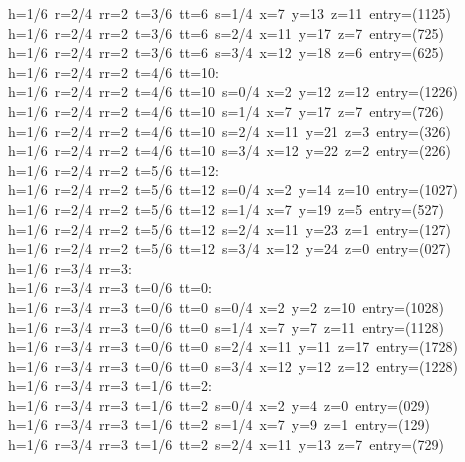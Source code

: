 \begin{tabbing}
h=1/6\ r=2/4\ rr=2\ t=3/6\ tt=6\ s=1/4\ x=7\ y=13\ z=11\ entry=(1125)\\[0pt]
h=1/6\ r=2/4\ rr=2\ t=3/6\ tt=6\ s=2/4\ x=11\ y=17\ z=7\ entry=(725)\\[0pt]
h=1/6\ r=2/4\ rr=2\ t=3/6\ tt=6\ s=3/4\ x=12\ y=18\ z=6\ entry=(625)\\[0pt]
h=1/6\ r=2/4\ rr=2\ t=4/6\ tt=10:\\[0pt]
h=1/6\ r=2/4\ rr=2\ t=4/6\ tt=10\ s=0/4\ x=2\ y=12\ z=12\ entry=(1226)\\[0pt]
h=1/6\ r=2/4\ rr=2\ t=4/6\ tt=10\ s=1/4\ x=7\ y=17\ z=7\ entry=(726)\\[0pt]
h=1/6\ r=2/4\ rr=2\ t=4/6\ tt=10\ s=2/4\ x=11\ y=21\ z=3\ entry=(326)\\[0pt]
h=1/6\ r=2/4\ rr=2\ t=4/6\ tt=10\ s=3/4\ x=12\ y=22\ z=2\ entry=(226)\\[0pt]
h=1/6\ r=2/4\ rr=2\ t=5/6\ tt=12:\\[0pt]
h=1/6\ r=2/4\ rr=2\ t=5/6\ tt=12\ s=0/4\ x=2\ y=14\ z=10\ entry=(1027)\\[0pt]
h=1/6\ r=2/4\ rr=2\ t=5/6\ tt=12\ s=1/4\ x=7\ y=19\ z=5\ entry=(527)\\[0pt]
h=1/6\ r=2/4\ rr=2\ t=5/6\ tt=12\ s=2/4\ x=11\ y=23\ z=1\ entry=(127)\\[0pt]
h=1/6\ r=2/4\ rr=2\ t=5/6\ tt=12\ s=3/4\ x=12\ y=24\ z=0\ entry=(027)\\[0pt]
h=1/6\ r=3/4\ rr=3:\\[0pt]
h=1/6\ r=3/4\ rr=3\ t=0/6\ tt=0:\\[0pt]
h=1/6\ r=3/4\ rr=3\ t=0/6\ tt=0\ s=0/4\ x=2\ y=2\ z=10\ entry=(1028)\\[0pt]
h=1/6\ r=3/4\ rr=3\ t=0/6\ tt=0\ s=1/4\ x=7\ y=7\ z=11\ entry=(1128)\\[0pt]
h=1/6\ r=3/4\ rr=3\ t=0/6\ tt=0\ s=2/4\ x=11\ y=11\ z=17\ entry=(1728)\\[0pt]
h=1/6\ r=3/4\ rr=3\ t=0/6\ tt=0\ s=3/4\ x=12\ y=12\ z=12\ entry=(1228)\\[0pt]
h=1/6\ r=3/4\ rr=3\ t=1/6\ tt=2:\\[0pt]
h=1/6\ r=3/4\ rr=3\ t=1/6\ tt=2\ s=0/4\ x=2\ y=4\ z=0\ entry=(029)\\[0pt]
h=1/6\ r=3/4\ rr=3\ t=1/6\ tt=2\ s=1/4\ x=7\ y=9\ z=1\ entry=(129)\\[0pt]
h=1/6\ r=3/4\ rr=3\ t=1/6\ tt=2\ s=2/4\ x=11\ y=13\ z=7\ entry=(729)\\[0pt]

\end{tabbing}
